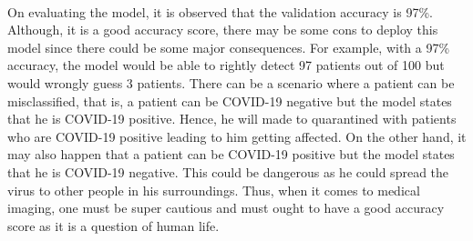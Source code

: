 \documentclass[12pt]{revtex4}
\begin{document}
\\On evaluating the model, it is observed that the validation accuracy is 97\%. Although, it is a good accuracy score, there may be some cons to deploy this model since there could be some major consequences. For example, with a 97\% accuracy, the model would be able to rightly detect 97 patients out of 100 but would wrongly guess 3 patients. There can be a scenario where a patient can be misclassified, that is, a patient can be COVID-19 negative but the model states that he is COVID-19 positive. Hence, he will made to quarantined with patients who are COVID-19 positive leading to him getting affected. On the other hand, it may also happen that a patient can be COVID-19 positive but the model states that he is COVID-19 negative. This could be dangerous as he could spread the virus to other people in his surroundings. Thus, when it comes to medical imaging, one must be super cautious and must ought to have a good accuracy score as it is a question of human life. 

\pagebreak
\end{document}
